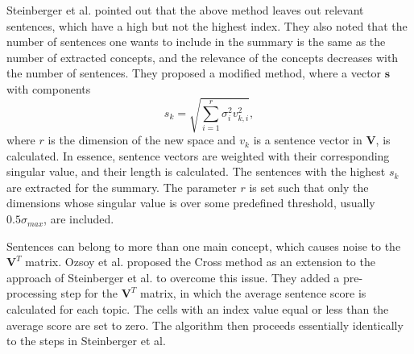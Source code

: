\documentclass[conference]{IEEEtran}
\begin{document}
Steinberger et al. \cite{steinberger2004} pointed out that the above method leaves out relevant sentences, which have a high but not the highest index. They also noted that the number of sentences one wants to include in the summary is the same as the number of extracted concepts, and the relevance of the concepts decreases with the number of sentences. They proposed a modified method, where a vector $\mathbf{s}$ with components
\begin{equation}
s_k = \sqrt{\sum \limits_{i=1}^{r} \sigma_i^2 v_{k,i}^2},
\end{equation}
where $r$ is the dimension of the new space and $v_k$ is a sentence vector in $\mathbf{V}$, is calculated. In essence, sentence vectors are weighted with their corresponding singular value, and their length is calculated. The sentences with the highest $s_k$ are extracted for the summary. The parameter $r$ is set such that only the dimensions whose singular value is over some predefined threshold, usually $0.5 \sigma_{max}$, are included.

Sentences can belong to more than one main concept, which causes noise to the $\mathbf{V}^T$ matrix. Ozsoy et al. \cite{ozsoy2010} proposed the Cross method as an extension to the approach of Steinberger et al. to overcome this issue. They added a pre-processing step for the $\mathbf{V}^T$ matrix, in which the average sentence score is calculated for each topic. The cells with an index value equal or less than the average score are set to zero. The algorithm then proceeds essentially identically to the steps in Steinberger et al.

\end{document}

